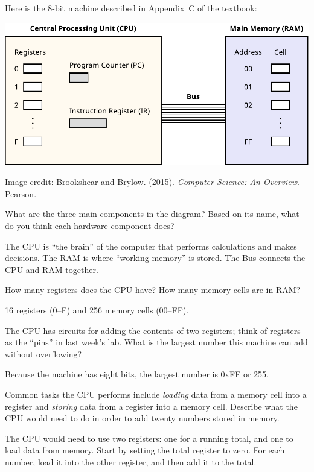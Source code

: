 
Here is the 8-bit machine described in Appendix~C of the textbook:

\begin{center}
\includegraphics[width=0.8\linewidth]{cpu-bus-ram.pdf}
\end{center}

\begin{center}
\color{gray}\scriptsize Image credit:
Brookshear and Brylow. (2015). \textit{Computer Science: An Overview}. Pearson.
\end{center}




\Q What are the three main components in the diagram?
Based on its name, what do you think each hardware component does?

\begin{answer}
The CPU is ``the brain'' of the computer that performs calculations and makes decisions.
The RAM is where ``working memory'' is stored.
The Bus connects the CPU and RAM together.
\end{answer}


\Q How many registers does the CPU have? How many memory cells are in RAM?

\begin{answer}[3em]
16 registers (0--F) and 256 memory cells (00--FF).
\end{answer}


\Q The CPU has circuits for adding the contents of two registers; think of registers as the ``pins'' in last week's lab.
What is the largest number this machine can add without overflowing?

\begin{answer}[3em]
Because the machine has eight bits, the largest number is 0xFF or 255.
\end{answer}


\Q Common tasks the CPU performs include \emph{loading} data from a memory cell into a register and \emph{storing} data from a register into a memory cell.
Describe what the CPU would need to do in order to add twenty numbers stored in memory.

\begin{answer}[6em]
The CPU would need to use two registers: one for a running total, and one to load data from memory.
Start by setting the total register to zero.
For each number, load it into the other register, and then add it to the total.
\end{answer}
